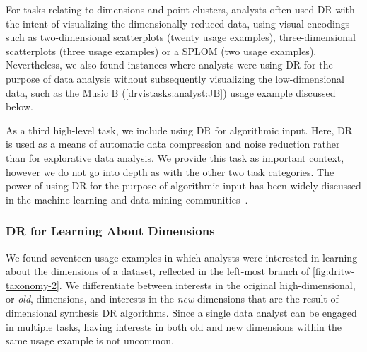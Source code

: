 For tasks relating to dimensions and point clusters, analysts often used \ac{DR} with the intent of visualizing the dimensionally reduced data, using visual encodings such as two-dimensional scatterplots (twenty usage examples), three-dimensional scatterplots (three usage examples) or a \ac{SPLOM} (two usage examples). 
Nevertheless, we also found instances where analysts were using \ac{DR} for the purpose of data analysis without subsequently visualizing the low-dimensional data, such as the {\sc Music B} (\ref{drvistasks:analyst:JB}) usage example discussed below. 

As a third high-level task, we include using \ac{DR} for algorithmic input. 
Here, \ac{DR} is used as a means of automatic data compression and noise reduction rather than for explorative data analysis. 
We provide this task as important context, however we do not go into depth as with the other two task categories. 
The power of using \ac{DR} for the purpose of algorithmic input has been widely discussed in the machine learning and data mining communities~\cite{Bingham2001,Murphy2012}. 


\subsubsection{DR for Learning About Dimensions}
\label{app:drvistasks:dritw:taxonomy:dimensions}


We found seventeen usage examples in which analysts were interested in learning about the dimensions of a dataset, reflected in the left-most branch of \autoref{fig:dritw-taxonomy-2}.
We differentiate between interests in the original high-dimensional, or {\it old}, dimensions, and interests in the {\it new} dimensions that are the result of dimensional synthesis \ac{DR} algorithms. 
Since a single data analyst can be engaged in multiple tasks, having interests in both old and new dimensions within the same usage example is not uncommon. 

